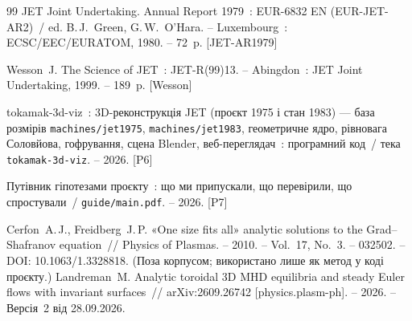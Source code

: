 \begin{thebibliography}{99}
 JET Joint Undertaking. Annual Report 1979~: EUR-6832 EN (EUR-JET-AR2)~/ ed. B.\,J.~Green,
  G.\,W.~O'Hara. -- Luxembourg~: ECSC/EEC/EURATOM, 1980. -- 72~p. [JET-AR1979]

 Wesson~J. The Science of JET~: JET-R(99)13. -- Abingdon~: JET Joint Undertaking, 1999. -- 189~p. [Wesson]

 tokamak-3d-viz~: 3D-реконструкція JET (проєкт 1975 і стан 1983) --- база розмірів
  \texttt{machines/jet1975}, \texttt{machines/jet1983}, геометричне ядро, рівновага Соловйова, гофрування,
  сцена Blender, веб-переглядач~: програмний код~/ тека \texttt{tokamak-3d-viz}. -- 2026. [P6]

 Путівник гіпотезами проєкту~: що ми припускали, що перевірили, що спростували~/
  \texttt{guide/main.pdf}. -- 2026. [P7]

 Cerfon~A.\,J., Freidberg~J.\,P. «One size fits all» analytic solutions to the Grad--Shafranov
  equation~// Physics of Plasmas. -- 2010. -- Vol.~17, No.~3. -- 032502. -- DOI: 10.1063/1.3328818.
  (Поза корпусом; використано лише як метод у коді проєкту.)
 Landreman~M. Analytic toroidal 3D MHD equilibria and steady Euler flows with invariant
  surfaces~// arXiv:2609.26742 [physics.plasm-ph]. -- 2026. -- Версія~2 від 28.09.2026.
\end{thebibliography}
